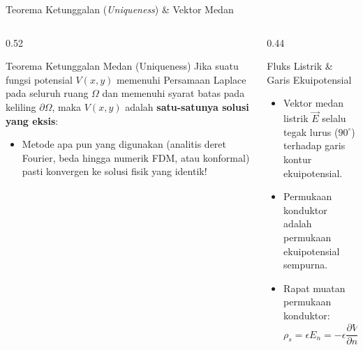 \documentclass[aspectratio=169,10pt]{beamer}
\begin{document}
\begin{frame}{Teorema Ketunggalan (\textit{Uniqueness}) \& Vektor Medan}
  \begin{columns}[t]
    \begin{column}{0.52\textwidth}
      \begin{block}{Teorema Ketunggalan Medan (Uniqueness)}
        \small
        Jika suatu fungsi potensial $V(x, y)$ memenuhi Persamaan Laplace pada seluruh ruang $\Omega$ dan memenuhi syarat batas pada keliling $\partial \Omega$, maka $V(x, y)$ adalah \textbf{satu-satunya solusi yang eksis}:
        \begin{itemize}
          \item Metode apa pun yang digunakan (analitis deret Fourier, beda hingga numerik FDM, atau konformal) pasti konvergen ke solusi fisik yang identik!
        \end{itemize}
      \end{block}
    \end{column}
    \begin{column}{0.44\textwidth}
      \begin{alertblock}{Fluks Listrik \& Garis Ekuipotensial}
        \small
        \begin{itemize}
          \item Vektor medan listrik $\vec{E}$ selalu tegak lurus ($90^\circ$) terhadap garis kontur ekuipotensial.
          \item Permukaan konduktor adalah permukaan ekuipotensial sempurna.
          \item Rapat muatan permukaan konduktor:
          \begin{equation*}
            \rho_s = \epsilon E_n = -\epsilon \left.\frac{\partial V}{\partial n}\right|_{\text{permukaan}}
          \end{equation*}
        \end{itemize}
      \end{alertblock}
    \end{column}
  \end{columns}
\end{frame}
\end{document}
